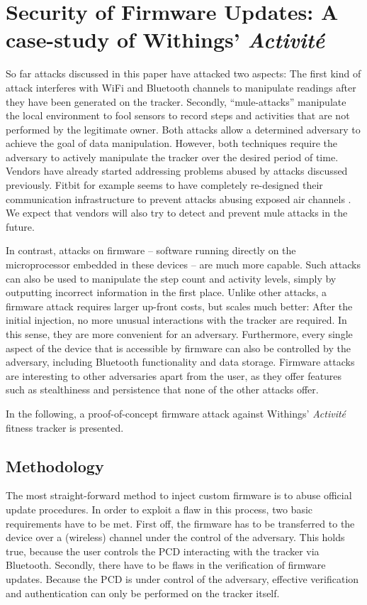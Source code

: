\documentclass[english]{lni}
\begin{document}
\section{Security of Firmware Updates: A case-study of Withings' \emph{Activité}}
\label{security_of_firmware_updates}

So far attacks discussed in this paper have attacked two aspects: The first kind of attack interferes with WiFi and Bluetooth channels to manipulate readings after they have been generated on the tracker. Secondly, ``mule-attacks'' manipulate the local environment to fool sensors to record steps and activities that are not performed by the legitimate owner. Both attacks allow a determined adversary to achieve the goal of data manipulation. However, both techniques require the adversary to actively manipulate the tracker over the desired period of time. Vendors have already started addressing problems abused by attacks discussed previously. Fitbit for example seems to have completely re-designed their communication infrastructure to prevent attacks abusing exposed air channels \cite{FitbitReimplemented}. We expect that vendors will also try to detect and prevent mule attacks in the future.

In contrast, attacks on firmware -- software running directly on the microprocessor embedded in these devices -- are much more capable. Such attacks can also be used to manipulate the step count and activity levels, simply by outputting incorrect information in the first place. Unlike other attacks, a firmware attack requires larger up-front costs, but scales much better: After the initial injection, no more unusual interactions with the tracker are required. In this sense, they are more convenient for an adversary. Furthermore, every single aspect of the device that is accessible by firmware can also be controlled by the adversary, including Bluetooth functionality and data storage. Firmware attacks are interesting to other adversaries apart from the user, as they offer features such as stealthiness and persistence that none of the other attacks offer.

In the following, a proof-of-concept firmware attack against Withings' \emph{Activité} fitness tracker is presented.

\subsection{Methodology}
\label{methodology}

The most straight-forward method to inject custom firmware is to abuse official update procedures. In order to exploit a flaw in this process, two basic requirements have to be met. First off, the firmware has to be transferred to the device over a (wireless) channel under the control of the adversary. This holds true, because the user controls the PCD interacting with the tracker via Bluetooth. Secondly, there have to be flaws in the verification of firmware updates. Because the PCD is under control of the adversary, effective verification and authentication can only be performed on the tracker itself.
\end{document}
